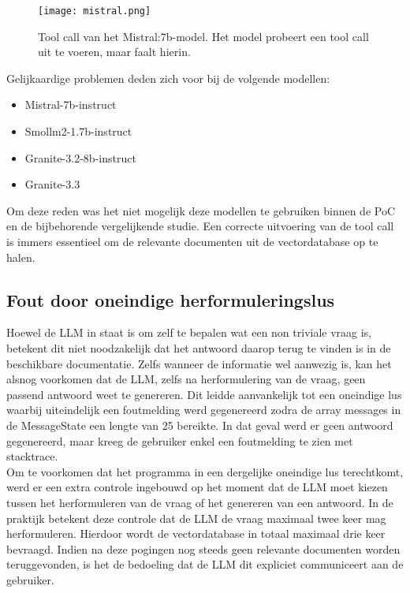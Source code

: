\begin{figure}[H]
    \texttt{[image: mistral.png]}
    \caption{Tool call van het Mistral:7b-model. Het model probeert een tool call uit te voeren, maar faalt hierin.}
    \label{fig:tool_call_Mistral}
\end{figure}

Gelijkaardige problemen deden zich voor bij de volgende modellen:
\begin{itemize}
    \item Mistral-7b-instruct
    \item Smollm2-1.7b-instruct
    \item Granite-3.2-8b-instruct
    \item Granite-3.3
\end{itemize}

Om deze reden was het niet mogelijk deze modellen te gebruiken binnen de PoC en de bijbehorende vergelijkende studie. Een correcte uitvoering van de tool call is immers essentieel om de relevante documenten uit de vectordatabase op te halen.

\subsection{Fout door oneindige herformuleringslus}

Hoewel de LLM in staat is om zelf te bepalen wat een non triviale vraag is, betekent dit niet noodzakelijk dat het antwoord daarop terug te vinden is in de beschikbare documentatie. Zelfs wanneer de informatie wel aanwezig is, kan het alsnog voorkomen dat de LLM, zelfs na herformulering van de vraag, geen passend antwoord weet te genereren. Dit leidde aanvankelijk tot een oneindige lus waarbij uiteindelijk een foutmelding werd gegenereerd zodra de array messages in de MessageState een lengte van 25 bereikte. In dat geval werd er geen antwoord gegenereerd, maar kreeg de gebruiker enkel een foutmelding te zien met stacktrace.
\\[1em]
Om te voorkomen dat het programma in een dergelijke oneindige lus terechtkomt, werd er een extra controle ingebouwd op het moment dat de LLM moet kiezen tussen het herformuleren van de vraag of het genereren van een antwoord. In de praktijk betekent deze controle dat de LLM de vraag maximaal twee keer mag herformuleren. Hierdoor wordt de vectordatabase in totaal maximaal drie keer bevraagd. Indien na deze pogingen nog steeds geen relevante documenten worden teruggevonden, is het de bedoeling dat de LLM dit expliciet communiceert aan de gebruiker. 

